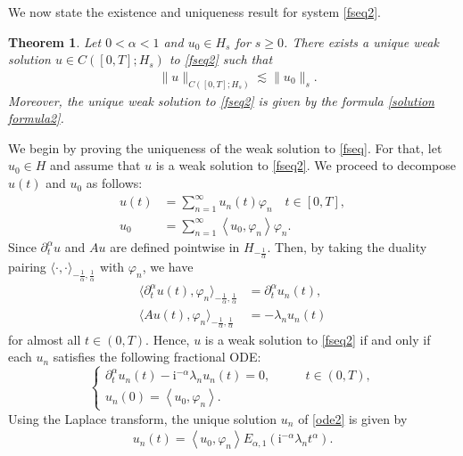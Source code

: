 \documentclass[reqno]{amsart}
\makeatletter
\renewenvironment{proof}[1][\proofname]{\par
  \pushQED{\qed}%
  \normalfont \topsep6\p@\@plus6\p@\relax
  \trivlist
  \item[\hskip\labelsep\bfseries #1\@addpunct{.}]%
}{%
  \popQED\endtrivlist\@endpefalse
}
\newtheorem{theorem}{Theorem}[section]
\numberwithin{equation}{section}
\makeatother
\begin{document}
We now state the existence and uniqueness result for system \eqref{fseq2}.
\begin{theorem} \label{Thm_well2}
	Let $0<\alpha < 1$ and $u_0\in H_s$ for $s\geq 0$. There exists a unique weak solution $u \in C([0, T] ; H_s)$ to \eqref{fseq2} such that 
		\begin{align}
			&\|u\|_{C([0,T];H_s)}\lesssim \|u_0\|_s.
		\end{align}
	Moreover, the unique weak solution to \eqref{fseq2} is given by the formula \eqref{solution formula2}.
\end{theorem}
\begin{proof}
	We begin by proving the uniqueness of the weak solution to \eqref{fseq}. For that, let $u_0\in H$ and assume that $u$ is a weak solution to \eqref{fseq2}. We proceed to decompose 
	$u(t)$ and $u_0$ as follows:
	\begin{align*}
		u(t)&=\sum_{n=1}^{\infty}u_n(t)\varphi_n\quad t\in [0,T],\\
		u_0&=\sum_{n=1}^{\infty}\left\langle u_0, \varphi_n\right\rangle\varphi_n.
	\end{align*}
	Since $\partial_t^{\alpha}u$ and $Au$ are defined pointwise in $H_{-\frac{1}{\alpha}}$.
	Then, by taking the duality pairing $\langle\cdot,\cdot\rangle_{-\frac{1}{\alpha},\frac{1}{\alpha}}$ with $\varphi_n$, we have
	\begin{align*}
		\langle \partial_t^\alpha u(t), \varphi_{n} \rangle_{-\frac{1}{\alpha},\frac{1}{\alpha}}&=\partial_t^\alpha u_n(t),\\
		\langle Au(t), \varphi_{n} \rangle _{-\frac{1}{\alpha},\frac{1}{\alpha}} &=-\lambda_{n}u_n(t)
	\end{align*}
	for almost all $t\in (0,T)$.
	Hence, $u$ is a weak solution to \eqref{fseq2} 
	if and only if each $u_n$ satisfies the following fractional ODE:
	\begin{equation}\label{ode2}
		\begin{cases}
			\partial_t^\alpha u_n(t) - \mathrm{i}^{-\alpha} \lambda_{n}u_n(t) = 0, &\qquad t \in (0,T),\\
			u_n(0)=\left\langle u_0, \varphi_n\right\rangle.
		\end{cases}
	\end{equation}
	Using the Laplace transform, the unique solution $u_n$ of \eqref{ode2} is given by
	\begin{align*}
		u_n(t)=\left\langle u_0, \varphi_n\right\rangle E_{\alpha,1}(\mathrm{i}^{-\alpha} \lambda_{n} t^{\alpha}).
	\end{align*}

\end{proof}
\end{document}
